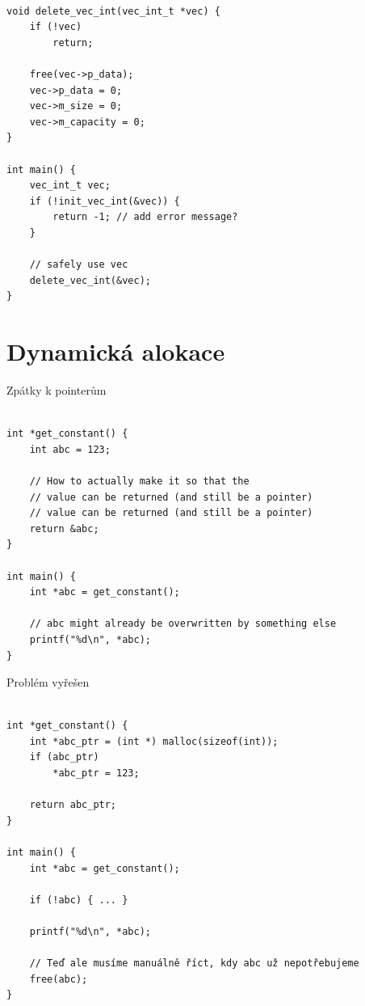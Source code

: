 \documentclass{beamer}
\begin{document}
\begin{frame}[fragile]

{\small
\begin{verbatim}

void delete_vec_int(vec_int_t *vec) {
    if (!vec)
        return;

    free(vec->p_data);
    vec->p_data = 0;
    vec->m_size = 0;
    vec->m_capacity = 0;
}

int main() {
    vec_int_t vec;
    if (!init_vec_int(&vec)) {
        return -1; // add error message?
    }

    // safely use vec
    delete_vec_int(&vec);
}

\end{verbatim}
}
\end{frame}

\section{Dynamická alokace}

\begin{frame}[fragile]{Zpátky k pointerům}

{\small
\begin{verbatim}

int *get_constant() {
    int abc = 123;

    // How to actually make it so that the
    // value can be returned (and still be a pointer)
    // value can be returned (and still be a pointer)
    return &abc;
}

int main() {
    int *abc = get_constant();

    // abc might already be overwritten by something else
    printf("%d\n", *abc);     
}
\end{verbatim}
}
    
\end{frame}

\begin{frame}[fragile]{Problém vyřešen}

{\small
\begin{verbatim}

int *get_constant() {
    int *abc_ptr = (int *) malloc(sizeof(int));
    if (abc_ptr)
        *abc_ptr = 123;

    return abc_ptr;
}

int main() {
    int *abc = get_constant();

    if (!abc) { ... }

    printf("%d\n", *abc);

    // Teď ale musíme manuálně říct, kdy abc už nepotřebujeme
    free(abc);
}
    
\end{verbatim}
}
    
\end{frame}
\end{document}

